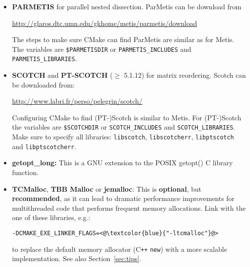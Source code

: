 \documentclass{article}
\begin{document}
\begin{itemize}
  \url{http://glaros.dtc.umn.edu/gkhome/metis/metis/download}.

  CMake looks for the Metis inlude files the library in the default
  locations as well as in
  \lstinline[style=Bash]!$METISDIR/include!  and
  \lstinline[style=Bash]!$METISDIR/lib!. Using the Bash shell, the
  METISDIR environment variable can be set as\\
  \lstinline[style=Bash]!export METISDIR=/usr/local/metis/!.
  Alternatively, you can specify the
  location of the header and library as follows:
  \begin{lstlisting}[style=Bash]
    > cmake <@\textcolor{blue}{.../STRUMPACK-x.y.z}@> -DCMAKE_BUILD_TYPE=<@\textcolor{blue}{Release}@>
      -DMETIS_INCLUDES=<@\textcolor{blue}{./usr/local/metis/include}@> \
      -DMETIS_LIBRARIES=<@\textcolor{blue}{./usr/local/metis/lib/libmetis.a}@>
  \end{lstlisting}

\item \textbf{PARMETIS} for parallel nested dissection. ParMetis can
  be download from

  \url{http://glaros.dtc.umn.edu/gkhome/metis/parmetis/download}

  The steps to make sure CMake can find ParMetis are similar as for
  Metis. The variables are
  \lstinline[style=Bash]!$PARMETISDIR! or
  \lstinline[style=Bash]!PARMETIS_INCLUDES! and
  \lstinline[style=Bash]!PARMETIS_LIBRARIES!.

\item \textbf{SCOTCH} and \textbf{PT-SCOTCH} ($\geq$ 5.1.12) for
  matrix reordering. Scotch can be downloaded from:

  \url{http://www.labri.fr/perso/pelegrin/scotch/}

  Configuring CMake to find (PT-)Scotch is similar to Metis. For
  (PT-)Scotch the variables are
  \lstinline[style=Bash]!$SCOTCHDIR! or
  \lstinline[style=Bash]!SCOTCH_INCLUDES! and
  \lstinline[style=Bash]!SCOTCH_LIBRARIES!. Make sure to specify all
  libraries: \lstinline[style=Bash]!libscotch!,
  \lstinline[style=Bash]!libscotcherr!,
  \lstinline[style=Bash]!libptscotch! and
  \lstinline[style=Bash]!libptscotcherr!.

\item \textbf{getopt\_long:} This is a GNU extension to the POSIX
  getopt() C library function.
\item \textbf{TCMalloc}, \textbf{TBB Malloc} or \textbf{jemalloc}:
  This is \textbf{optional}, but \textbf{recommended}, as it can lead
  to dramatic performance improvements for multithreaded code that
  performs frequent memory allocations. Link with the one of these
  libraries, e.g.:
  \begin{lstlisting}[style=Bash]
  -DCMAKE_EXE_LINKER_FLAGS=<@\textcolor{blue}{"-ltcmalloc"}@>
  \end{lstlisting}
  to replace the default memory allocator (C\texttt{++} \texttt{new})
  with a more scalable implementation. See also
  Section~\ref{sec:tips}.
\end{itemize}
\end{document}
